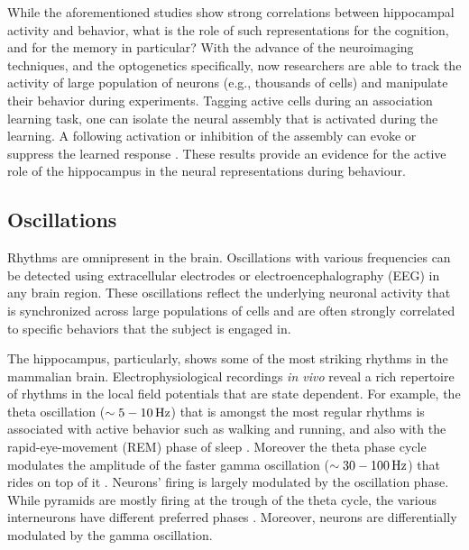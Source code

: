     While the aforementioned studies show strong correlations between
    hippocampal activity and behavior, what is the role of such representations
    for the cognition, and for the memory in particular? With the advance of
    the neuroimaging techniques, and the optogenetics specifically, now
    researchers are able to track the activity of large population of neurons
    (e.g., thousands of cells) and manipulate their behavior during
    experiments. Tagging active cells during an association learning task, one
    can isolate the neural assembly that is activated during the learning. A
    following activation or inhibition of the assembly can evoke or suppress
    the learned response \citep{Cowansage2014, Tanaka2014}. These results
    provide an evidence for the active role of the hippocampus in the neural
    representations during behaviour.

  \subsection{Oscillations}
    Rhythms are omnipresent in the brain. Oscillations with various frequencies
    can be detected using extracellular electrodes or electroencephalography
    (EEG) in any brain region. These oscillations reflect the underlying
    neuronal activity that is synchronized across large populations of cells
    and are often strongly correlated to specific behaviors that the subject is
    engaged in.

    The hippocampus, particularly, shows some of the most striking rhythms in
    the mammalian brain. Electrophysiological recordings \textit{in vivo}
    reveal a rich repertoire of rhythms in the local field potentials that are
    state dependent. For example, the theta oscillation ($\sim 5-10 \rm\, Hz$)
    that is amongst the most regular rhythms is associated with active behavior
    such as walking and running, and also with the rapid-eye-movement (REM)
    phase of sleep \citep{Jung1938, Buzsaki2002}. Moreover the theta phase
    cycle modulates the amplitude of the faster gamma oscillation ($\sim 30-100
    \rm\, Hz$) that rides on top of it \citep{Bragin1995, Buzsaki2002}.
    Neurons' firing is largely modulated by the oscillation phase. While
    pyramids are mostly firing at the trough of the theta cycle, the various
    interneurons have different preferred phases \citep{Klausberger2008,
    Klausberger2009}. Moreover, neurons are differentially modulated by the
    gamma oscillation.

